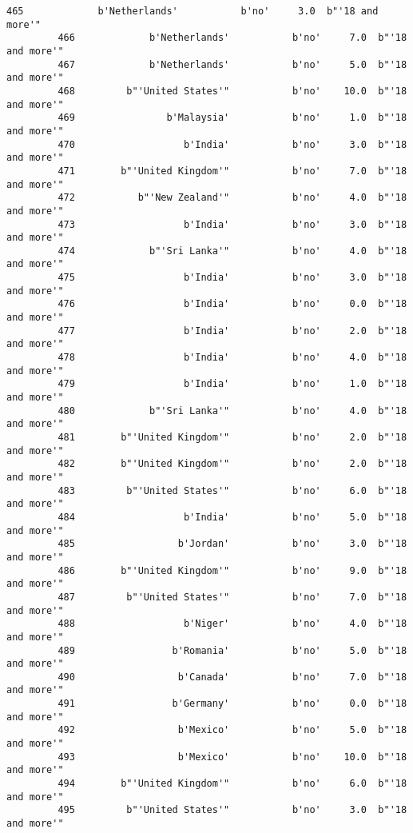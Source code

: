 \documentclass[11pt]{article}
\begin{document}
\begin{Verbatim}[commandchars=\\\{\}]
         465             b'Netherlands'           b'no'     3.0  b"'18 and more'"   
         466             b'Netherlands'           b'no'     7.0  b"'18 and more'"   
         467             b'Netherlands'           b'no'     5.0  b"'18 and more'"   
         468         b"'United States'"           b'no'    10.0  b"'18 and more'"   
         469                b'Malaysia'           b'no'     1.0  b"'18 and more'"   
         470                   b'India'           b'no'     3.0  b"'18 and more'"   
         471        b"'United Kingdom'"           b'no'     7.0  b"'18 and more'"   
         472           b"'New Zealand'"           b'no'     4.0  b"'18 and more'"   
         473                   b'India'           b'no'     3.0  b"'18 and more'"   
         474             b"'Sri Lanka'"           b'no'     4.0  b"'18 and more'"   
         475                   b'India'           b'no'     3.0  b"'18 and more'"   
         476                   b'India'           b'no'     0.0  b"'18 and more'"   
         477                   b'India'           b'no'     2.0  b"'18 and more'"   
         478                   b'India'           b'no'     4.0  b"'18 and more'"   
         479                   b'India'           b'no'     1.0  b"'18 and more'"   
         480             b"'Sri Lanka'"           b'no'     4.0  b"'18 and more'"   
         481        b"'United Kingdom'"           b'no'     2.0  b"'18 and more'"   
         482        b"'United Kingdom'"           b'no'     2.0  b"'18 and more'"   
         483         b"'United States'"           b'no'     6.0  b"'18 and more'"   
         484                   b'India'           b'no'     5.0  b"'18 and more'"   
         485                  b'Jordan'           b'no'     3.0  b"'18 and more'"   
         486        b"'United Kingdom'"           b'no'     9.0  b"'18 and more'"   
         487         b"'United States'"           b'no'     7.0  b"'18 and more'"   
         488                   b'Niger'           b'no'     4.0  b"'18 and more'"   
         489                 b'Romania'           b'no'     5.0  b"'18 and more'"   
         490                  b'Canada'           b'no'     7.0  b"'18 and more'"   
         491                 b'Germany'           b'no'     0.0  b"'18 and more'"   
         492                  b'Mexico'           b'no'     5.0  b"'18 and more'"   
         493                  b'Mexico'           b'no'    10.0  b"'18 and more'"   
         494        b"'United Kingdom'"           b'no'     6.0  b"'18 and more'"   
         495         b"'United States'"           b'no'     3.0  b"'18 and more'"   

\end{Verbatim}
\end{document}
